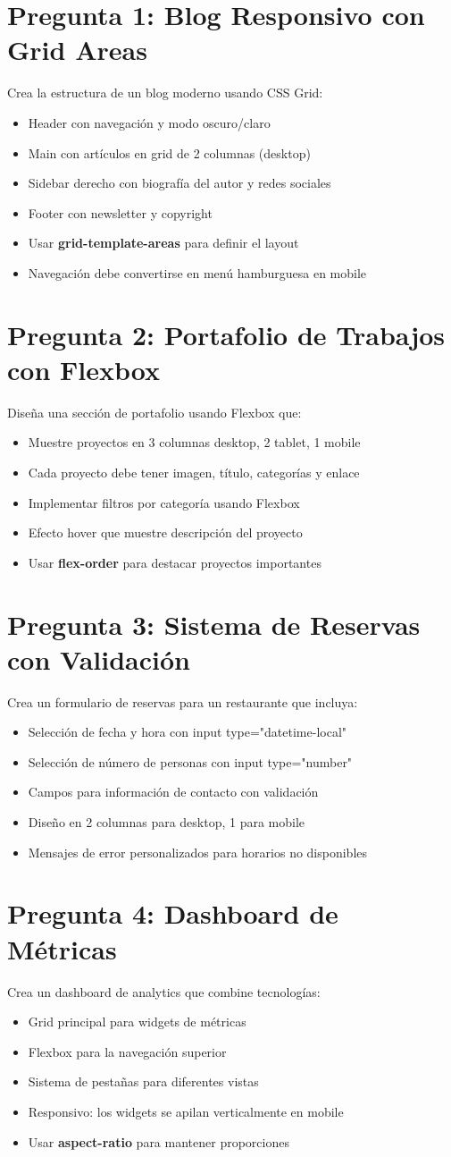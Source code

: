 \documentclass[12pt, a4paper]{article}
\newcommand{\pregunta}[2]{
    \section*{Pregunta #1: #2}
    \vspace{0.3em}
}
\begin{document}
\pregunta{1}{Blog Responsivo con Grid Areas}
Crea la estructura de un blog moderno usando CSS Grid:
\begin{itemize}
\item Header con navegación y modo oscuro/claro
\item Main con artículos en grid de 2 columnas (desktop)
\item Sidebar derecho con biografía del autor y redes sociales
\item Footer con newsletter y copyright
\item Usar \textbf{grid-template-areas} para definir el layout
\item Navegación debe convertirse en menú hamburguesa en mobile
\end{itemize}

\pregunta{2}{Portafolio de Trabajos con Flexbox}
Diseña una sección de portafolio usando Flexbox que:
\begin{itemize}
\item Muestre proyectos en 3 columnas desktop, 2 tablet, 1 mobile
\item Cada proyecto debe tener imagen, título, categorías y enlace
\item Implementar filtros por categoría usando Flexbox
\item Efecto hover que muestre descripción del proyecto
\item Usar \textbf{flex-order} para destacar proyectos importantes
\end{itemize}

\pregunta{3}{Sistema de Reservas con Validación}
Crea un formulario de reservas para un restaurante que incluya:
\begin{itemize}
\item Selección de fecha y hora con input type="datetime-local"
\item Selección de número de personas con input type="number"
\item Campos para información de contacto con validación
\item Diseño en 2 columnas para desktop, 1 para mobile
\item Mensajes de error personalizados para horarios no disponibles
\end{itemize}

\pregunta{4}{Dashboard de Métricas}
Crea un dashboard de analytics que combine tecnologías:
\begin{itemize}
\item Grid principal para widgets de métricas
\item Flexbox para la navegación superior
\item Sistema de pestañas para diferentes vistas
\item Responsivo: los widgets se apilan verticalmente en mobile
\item Usar \textbf{aspect-ratio} para mantener proporciones
\end{itemize}
\end{document}
